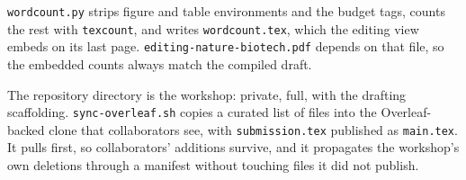 \texttt{wordcount.py} strips figure and table environments and the budget tags,
counts the rest with \texttt{texcount}, and writes \texttt{wordcount.tex}, which the
editing view embeds on its last page. \texttt{editing-nature-biotech.pdf} depends on that file, so
the embedded counts always match the compiled draft.

The repository directory is the workshop: private, full, with the drafting
scaffolding. \texttt{sync-overleaf.sh} copies a curated list of files into the
Overleaf-backed clone that collaborators see, with \texttt{submission.tex}
published as \texttt{main.tex}. It pulls first, so collaborators' additions
survive, and it propagates the workshop's own deletions through a manifest without
touching files it did not publish.
